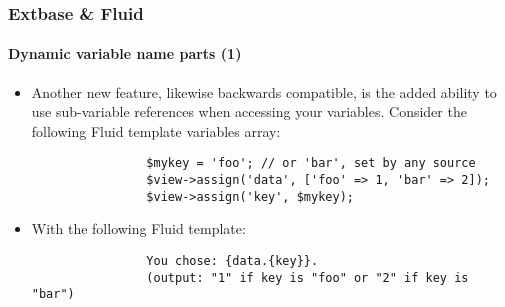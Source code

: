 
\begin{frame}[fragile]
	\frametitle{Extbase \& Fluid}
	\framesubtitle{Dynamic variable name parts (1)}

	\lstset{basicstyle=\tiny\ttfamily}

	\begin{itemize}

		\item Another new feature, likewise backwards compatible, is the added
			ability to use sub-variable references when accessing your variables.
			Consider the following Fluid template variables array:

			\begin{lstlisting}
				$mykey = 'foo'; // or 'bar', set by any source
				$view->assign('data', ['foo' => 1, 'bar' => 2]);
				$view->assign('key', $mykey);
			\end{lstlisting}

		\item With the following Fluid template:

			\begin{lstlisting}
				You chose: {data.{key}}.
				(output: "1" if key is "foo" or "2" if key is "bar")
			\end{lstlisting}

	\end{itemize}

\end{frame}


